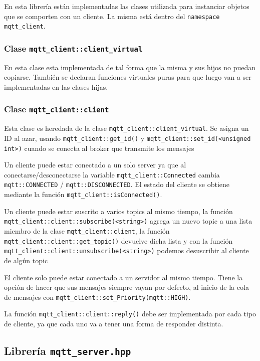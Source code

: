     En esta librería están implementadas las clases utilizada para instanciar objetos que se comporten con un cliente. La misma está dentro del \texttt{namespace mqtt\_client}.

    \subsubsection{Clase \texttt{mqtt\_client::client\_virtual}}
    En esta clase esta implementada de tal forma que la misma y sus hijos no puedan copiarse. También se declaran funciones virtuales puras para que luego van a ser implementadas en las clases hijas.

    \subsubsection{Clase \texttt{mqtt\_client::client}}

    Esta clase es heredada de la clase \verb|mqtt_client::client_virtual|. Se asigna un ID al azar, usando \verb|mqtt_client::get_id()| y \verb|mqtt_client::set_id(<unsigned int>)|  cuando se conecta al broker que transmite los mensajes

    Un cliente puede estar conectado a un solo server ya que al conectarse/desconectarse la variable \verb|mqtt_client::Connected| cambia \verb|mqtt::CONNECTED| / \verb|mqtt::DISCONNECTED|. El estado del cliente se obtiene mediante la función \verb|mqtt_client::isConnected()|.

    Un cliente puede estar suscrito a varios topics al mismo tiempo, la función \verb|mqtt_client::client::subscribe(<string>)|  agrega un nuevo topic a una lista miembro de la clase \verb|mqtt_client::client|, la función \verb|mqtt_client::client::get_topic()| devuelve dicha lista y con la función \verb|mqtt_client::client::unsubscribe(<string>)|  podemos desuscribir al cliente de algún topic

    El cliente solo puede estar conectado a un servidor
    al mismo tiempo. Tiene la opción de hacer que sus mensajes siempre vayan por defecto, al inicio de la cola de mensajes con  \verb|mqtt_client::set_Priority(mqtt::HIGH)|.

    La función \verb|mqtt_client::client::reply()| debe ser implementada por cada tipo de cliente, ya  que cada uno va a tener una forma de responder distinta.


\subsection{Librería \texttt{mqtt\_server.hpp}}

